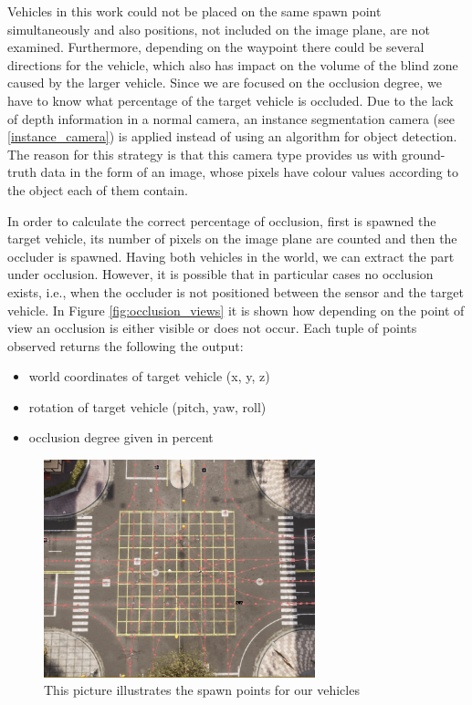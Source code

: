 Vehicles in this work could not be placed on the same spawn point simultaneously and also positions, not included on the image plane, are not examined. Furthermore, depending on the waypoint there could be several directions for the vehicle, which also has impact on the volume of the blind zone caused by the larger vehicle. Since we are focused on the occlusion degree, we have to know what percentage of the target vehicle is occluded. Due to the lack of depth information in a normal camera, an instance segmentation camera (see \ref{instance_camera}) is applied instead of using an algorithm for object detection. The reason for this strategy is that this camera type provides us with ground-truth data in the form of an image, whose pixels have colour values according to the object each of them contain. 

In order to calculate the correct percentage of occlusion, first is spawned the target vehicle, its number of pixels on the image plane are counted and then the occluder is spawned. Having both vehicles in the world, we can extract the part under occlusion. However, it is possible that in particular cases no occlusion exists, i.e., when the occluder is not positioned between the sensor and the target vehicle. In Figure \ref{fig:occlusion_views} it is shown how depending on the point of view an occlusion is either visible or does not occur. Each tuple of points observed returns the following the output:
\begin{itemize}
    \item world coordinates of target vehicle (x, y, z)
    \item rotation of target vehicle (pitch, yaw, roll)
    \item occlusion degree given in percent
\end{itemize}

\begin{figure} [h!]
    \centering
    \includegraphics[width=0.7\textwidth]{images/waypoints.png}
    \caption[Intersection waypoints]{This picture illustrates the spawn points for our vehicles}
    \label{fig:waypoints}
\end{figure}

